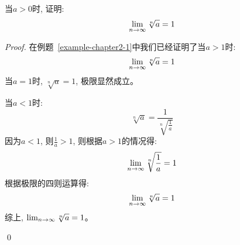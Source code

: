 \begin{example}
    当$a > 0$时, 证明:
    \begin{equation*}
        \lim_{n \to \infty } \sqrt[n]{a} = 1
    \end{equation*}
\end{example}
\begin{proof}
    在例题~\ref{example-chapter2-1}中我们已经证明了当$a > 1$时:
    \begin{equation*}
        \lim_{n \to \infty } \sqrt[n]{a} = 1
    \end{equation*}
    当$a = 1$时, $\sqrt[n]{a} = 1$, 极限显然成立。

    当$a < 1$时:
    \begin{equation*}
        \sqrt[n]{a} = \frac{1}{\sqrt[n]{\frac{1}{a}}}
    \end{equation*}
    因为$a < 1$, 则$\frac{1}{a} > 1$, 则根据$a > 1$的情况得:
    \begin{equation*}
        \lim_{n \to \infty } \sqrt[n]{\frac{1}{a}} = 1
    \end{equation*}
    根据极限的四则运算得:
    \begin{equation*}
        \lim_{n \to \infty } \sqrt[n]{a} = 1
    \end{equation*}
    综上, $\lim_{n \to \infty } \sqrt[n]{a} = 1$。

    \qed
\end{proof}

